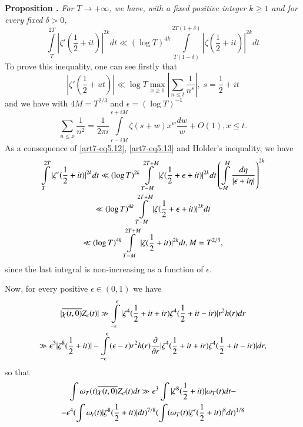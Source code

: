 \medskip
\noindent
{\bfseries Proposition .\label{art7-prop10}}
\textit{For $T \to+ \infty$, we have, with a fixed positive integer $k \geqslant 1$ and for every fixed $\delta > 0$,}
\begin{equation}
\int\limits^{2T}_T  |\zeta' (\frac{1}{2} + it) |^{2k} dt \ll (\log T)^{4k} \int\limits^{2T (1+\delta)}_{T(1-\delta)} |\zeta (\frac{1}{2} + it)|^{2k} dt\label{art7-eq5.11} 
\end{equation}
To prove this inequality, one can see firstly that 
\begin{equation}
|\zeta' (\frac{1}{2} + ut)| \ll \log T \max\limits_{x \geqslant 1} \left|\sum\limits_{n \leqslant t} \frac{1}{n^s} \right|, \; s = \frac{1}{2} + it 
\label{art7-eq5.12}
\end{equation}
and we have with $4M = T^{2/3}$ and $\epsilon = (\log T)^{-1}$
\begin{equation}
\sum\limits_{n \leqslant x} \frac{1}{n^2} = \frac{1}{2\pi  i} \int\limits^{\epsilon + i M}_{\epsilon - i M} \zeta(s+ w)  x^w \frac{dw}{w} + O(1), x \leqslant t.\label{art7-eq5.13}
\end{equation}
As a consequence of \eqref{art7-eq5.12}, \eqref{art7-eq5.13} and Holder's inequality, we have
\begin{gather}
\int\limits^{2T}_T |\zeta' (\frac{1}{2} + it)|^{2k} dt \ll (\log T)^{2k} \int\limits^{2T+ M}_{T-M} |\zeta(\frac{1}{2} + \epsilon + it)|^{2k} dt \left( \int\limits^M_{-M} \frac{d\eta}{|\epsilon + i\eta|}\right)^{2k} \label{art7-eq5.14}\\
\ll( \log T)^{4k} \int\limits^{2T+M}_{T-M} |\zeta(\frac{1}{2} + \epsilon + it)|^{2k} dt\notag\\
\ll (\log T)^{4k} \int\limits^{2T+ M}_{T-M} |\zeta(\frac{1}{2} + it) |^{2k} dt, M = T^{2/3}, \notag
\end{gather}\pageoriginale 
since the last integral is non-increasing as a function of $\epsilon$.

Now, for every positive $\epsilon \in (0,1)$ we have 
\begin{gather}
|\overline{\chi (t,0)} Z_c (t)| \gg \int\limits^\epsilon_{-\epsilon} |\zeta^4 (\frac{1}{2} +it + ir) \zeta^4 (\frac{1}{2} + it - ir) | r^2 h (r) dr \notag\\
\gg \epsilon^3 |\zeta^8 (\frac{1}{2} + it)| - \int\limits^{\epsilon} _{-\epsilon} (\epsilon -r) r^2 h(r) \frac{\partial}{\partial r} |\zeta^4(\frac{1}{2} + it + ir) \zeta^4 (\frac{1}{2} + it - ir)| dr, \label{art7-eq5.15}
\end{gather}
so that 
\begin{gather}
\int \omega_T (t) \overline{\chi (t, 0)} Z_c (t) dt \gg \epsilon^3 \int |\zeta^8 (\frac{1}{2} + it)| \omega_T (t) dt - \label{art7-eq5.16}\\
-\epsilon^4(\int \omega_t (t) |\zeta^8 (\frac{1}{2} + it)| dt)^{7/8} (\int (\omega_T (t)| \zeta' (\frac{1}{2} + it)|^8 dt)^{1/8} \notag
\end{gather}

